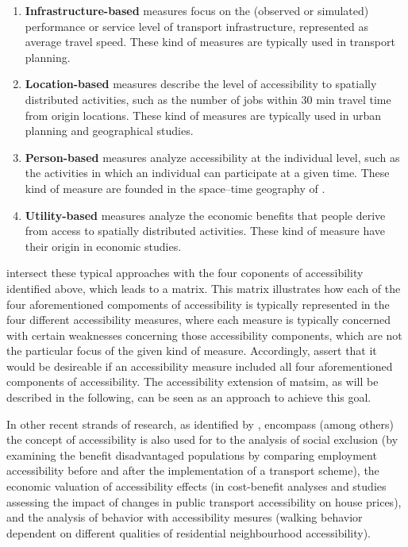 \begin{enumerate}
	\item \textbf{Infrastructure-based} measures focus on the (observed or simulated) performance or service level 
	of transport infrastructure, \eg represented as average travel speed. These kind of measures are typically used 
	in transport planning.
	
	\item \textbf{Location-based} measures describe the level of accessibility to spatially distributed activities, such as 
	the number of jobs within 30 min travel time from origin locations. These kind of measures are typically used 
	in urban planning and geographical studies.
	
	\item \textbf{Person-based} measures analyze accessibility at the individual level, such as the activities in which an 
	individual can participate at a given time. These kind of measure are founded in the space–time geography 
	of \citet{Haegerstrand1970}.
	
	\item \textbf{Utility-based} measures analyze the economic benefits that people derive from access to spatially 
	distributed activities. These kind of measure have their origin in economic studies.
\end{enumerate}

\citet{Geurs2004AccessibilityReview} intersect these typical approaches with the four coponents of accessibility identified 
above, which leads to a matrix. This matrix illustrates how each of the four aforementioned compoments of accessibility is 
typically represented in the four different accessibility measures, where each measure is typically concerned with certain weaknesses 
concerning those accessibility components, which are not the particular focus of the given kind of measure. Accordingly, \citet{Geurs2004AccessibilityReview} assert that it would be desireable if an accessibility measure included 
all four aforementioned components of accessibility. The accessibility extension of \gls{matsim}, as will be described in 
the following, can be seen as an approach to achieve this goal.

In other recent strands of research, as identified by \citet{GeursEtAl2012AccessibilityTransportIntroduction}, encompass (among 
others) the concept of accessibility is also used for to the analysis of social exclusion (\eg by examining the benefit 
disadvantaged populations by comparing employment accessibility before and after the implementation of a transport scheme), 
the economic valuation of accessibility effects (\eg in cost-benefit analyses and studies assessing the impact of changes in 
public transport accessibility on house prices), and the analysis of behavior with accessibility mesures (\eg walking behavior 
dependent on different qualities of residential neighbourhood accessibility). 


